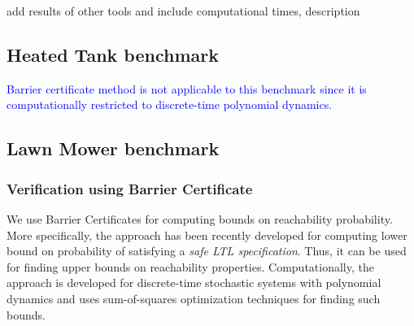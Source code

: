 \documentclass[EPiC]{easychair}
\newcommand{\todo}[1]{
  \begin{framed}
    \noindent{\bf TODO: }
    #1
  \end{framed}
}
\begin{document}
\todo{add results of other tools and include computational times, description}

\newpage


\subsection{Heated Tank benchmark}
\textcolor{blue}{Barrier certificate method is not applicable to this benchmark since it is computationally restricted to discrete-time polynomial dynamics.}
\newpage

\subsection{Lawn Mower benchmark}
\subsubsection{Verification using Barrier Certificate}
We use Barrier Certificates for computing bounds on reachability probability. More specifically, the approach has been recently developed for computing lower bound on probability of satisfying a \emph{safe LTL specification}. Thus, it can be used for finding upper bounds on reachability properties.
Computationally, the approach is developed for discrete-time stochastic systems with polynomial dynamics and uses sum-of-squares optimization techniques for finding such bounds.
\end{document}
